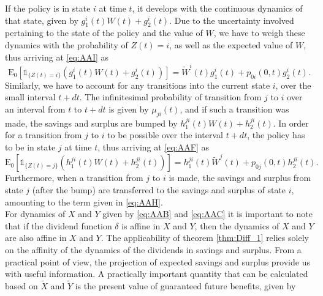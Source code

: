 \documentclass[12pt]{article}
\newcommand{\E}{\text{E}}
\newcommand{\indic}[1]{\mathds{1}_{ \{ #1 \} }}
\theoremstyle{my_thm}
\begin{document}
If the policy is in state $i$ at time $t$, it develops with the continuous dynamics of that state, given by $g^i_1(t)W(t)+g_2^i(t)$. Due to the uncertainty involved pertaining to the state of the policy and the value of $W$, we have to weigh these dynamics with the probability of $Z(t)=i$, as well as the expected value of $W$, thus arriving at \eqref{eq:AAI} as
$$
\E_0 [\indic{Z(t)=i} \left(g^i_1(t)W(t)+g_2^i(t)\right)]= \tilde{W}^i(t)g_1^i(t)+p_{0i}(0,t)g_2^i(t).
$$
Similarly, we have to account for any transitions into the current state $i$, over the small interval $t+dt$. The infinitesimal probability of transition from $j$ to $i$ over an interval from $t$ to $t+dt$ is given by $\mu_{ji}(t)$, and if such a transition was made, the savings and surplus are bumped by $h^{ji}_1(t)W(t)+h^{ji}_2(t)$. In order for a transition from $j$ to $i$ to be possible over the interval $t+dt$, the policy has to be in state $j$ at time $t$, thus arriving at 
\eqref{eq:AAF} as
$$
\E_0[ \indic{Z(t)=j} \left( h_1^{ji}(t)W(t)+ h_2^{ji}(t)\right)]= h_1^{ji}(t)\tilde{W}^j(t)+ p_{0j}(0,t)h_2^{ji}(t).
$$
Furthermore, when a transition from $j$ to $i$ is made, the savings and surplus from state $j$ (after the bump) are transferred to the savings and surplus of state $i$, amounting to the term given in \eqref{eq:AAH}. 
\\[12pt]
For dynamics of $X$ and $Y$ given by \eqref{eq:AAB} and \eqref{eq:AAC} it is important to note that if the dividend function $\delta$ is affine in $X$ and $Y$, then the dynamics of $X$ and $Y$ are also affine in $X$ and $Y$. The applicability of theorem \ref{thm:Diff_1} relies solely on the affinity of the dynamics of the dividends in savings and surplus. From a practical point of view, the projection of expected savings and surplus provide us with useful information. A practically important quantity that can be calculated based on $\tilde{X}$ and $\tilde{Y}$ is the present value of guaranteed future benefits, given by
\end{document}
